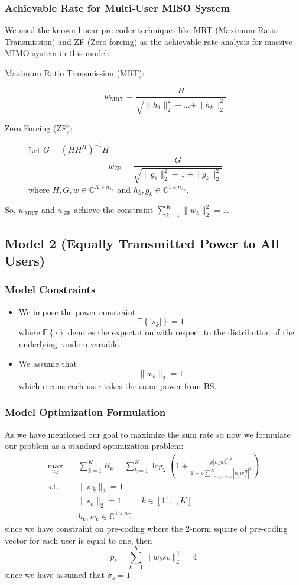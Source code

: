 \subsubsection{Achievable Rate for Multi-User MISO System}
We used the known linear pre-coder techniques like MRT (Maximum Ratio Transmission) and ZF (Zero forcing) as the achievable rate analysis for massive MIMO system in this model:
\begin{description}
    \item[Maximum Ratio Transmission (MRT):] \[ w_{\text{MRT}} = \frac{H}{\sqrt{\|h_1\|_2^2 + \ldots + \|h_k\|_2^2}} \]
    \item[Zero Forcing (ZF):] Let $G = \left( H H^H \right)^{-1} H$ \[ w_{\text{ZF}} = \frac{G}{\sqrt{\|g_1\|_2^2 + \ldots + \|g_k\|_2^2}} \]where $H, G, w \in \mathbb{C}^{K \times n_{T_x}}$ and $h_k, g_k \in \mathbb{C}^{1 \times n_{T_x}}$.
\end{description}
So, $w_{\text{MRT}}$ and $w_{\text{ZF}}$ achieve the constraint $\sum_{k=1}^{K}\|w_k\|^2_2 = 1$.

\subsection{Model 2 (Equally Transmitted Power to All Users)}
\subsubsection{Model Constraints}
\begin{itemize}
    \item We impose the power constraint \[\mathbb{E} \left\{ |s_k| \right\} = 1\] where $\mathbb{E}\left\{\cdot\right\}$ denotes the expectation with respect to the distribution of the underlying random variable.
    \item We assume that \[ \|w_k\|_2 = 1\] which means each user takes the same power from BS.
\end{itemize}
\subsubsection{Model Optimization Formulation}
As we have mentioned our goal to maximize the sum rate so now we formulate our problem as a standard optimization problem:
\begin{equation}
    \label{eq:multi-user opt sp}
    \begin{aligned}
        \max_{w_k} \quad & \sum_{k=1}^{K} R_k = \sum_{k=1}^{K} \log_2 \left( 1 + \frac{\rho | h_k w_k^H |^2}{1 + \rho \sum_{j=1, 1\neq k}^{K}| h_j w_j^H |^2} \right) \\
        \text{s.t.} \quad &  \|w_k\|_2 = 1 \\
        & \|s_k\|_2 =1 \quad , \quad k \in [1, \ldots , K] \\
        & h_k, w_k \in \mathbb{C}^{1 \times n_{T_x}}
    \end{aligned}
\end{equation}
since we have constraint on pre-coding where the 2-norm square of pre-coding vector for each user is equal to one, then
\[ p_t = \sum_{k=1}^{K}\|w_k s_k\|^2_2 = 4 \]
since we have assumed that $\sigma_s =1$
